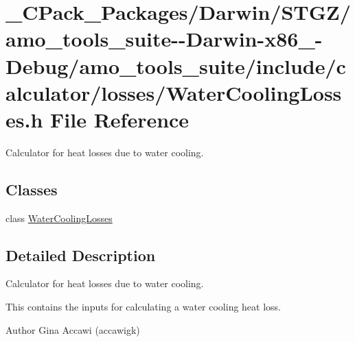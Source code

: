 \hypertarget{___c_pack___packages_2_darwin_2_s_t_g_z_2amo__tools__suite--_darwin-x86__64-_debug_2amo__tools__00eea4dd819e0d65bc0d16cf8790f94c}{}\section{\+\_\+\+C\+Pack\+\_\+\+Packages/\+Darwin/\+S\+T\+G\+Z/amo\+\_\+tools\+\_\+suite-\/-\/\+Darwin-\/x86\+\_-\/\+Debug/amo\+\_\+tools\+\_\+suite/include/calculator/losses/\+Water\+Cooling\+Losses.h File Reference}
\label{___c_pack___packages_2_darwin_2_s_t_g_z_2amo__tools__suite--_darwin-x86__64-_debug_2amo__tools__00eea4dd819e0d65bc0d16cf8790f94c}


Calculator for heat losses due to water cooling.  


\subsection*{Classes}
\begin{DoxyCompactItemize}
\item 
class \hyperlink{class_water_cooling_losses}{Water\+Cooling\+Losses}
\end{DoxyCompactItemize}


\subsection{Detailed Description}
Calculator for heat losses due to water cooling. 

This contains the inputs for calculating a water cooling heat loss.

\begin{DoxyAuthor}{Author}
Gina Accawi (accawigk) 
\end{DoxyAuthor}

